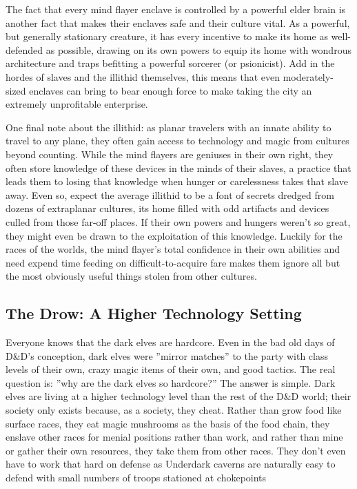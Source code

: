 The fact that every mind flayer enclave is controlled by a powerful elder brain is another fact that makes their enclaves safe and their culture vital. As a powerful, but generally stationary creature, it has every incentive to make its home as well-defended as possible, drawing on its own powers to equip its home with wondrous architecture and traps befitting a powerful sorcerer (or psionicist). Add in the hordes of slaves and the illithid themselves, this means that even moderately-sized enclaves can bring to bear enough force to make taking the city an extremely unprofitable enterprise.

One final note about the illithid: as planar travelers with an innate ability to travel to any plane, they often gain access to technology and magic from cultures beyond counting. While the mind flayers are geniuses in their own right, they often store knowledge of these devices in the minds of their slaves, a practice that leads them to losing that knowledge when hunger or carelessness takes that slave away. Even so, expect the average illithid to be a font of secrets dredged from dozens of extraplanar cultures, its home filled with odd artifacts and devices culled from those far-off places. If their own powers and hungers weren't so great, they might even be drawn to the exploitation of this knowledge. Luckily for the races of the worlds, the mind flayer's total confidence in their own abilities and need expend time feeding on difficult-to-acquire fare makes them ignore all but the most obviously useful things stolen from other cultures.\\



\subsection{The Drow: A Higher Technology Setting}
Everyone knows that the dark elves are hardcore. Even in the bad old days of D\&D's conception, dark elves were ''mirror matches'' to the party with class levels of their own, crazy magic items of their own, and good tactics. The real question is: ''why are the dark elves so hardcore?'' The answer is simple. Dark elves are living at a higher technology level than the rest of the D\&D world; their society only exists because, as a society, they cheat. Rather than grow food like surface races, they eat magic mushrooms as the basis of the food chain, they enslave other races for menial positions rather than work, and rather than mine or gather their own resources, they take them from other races. They don't even have to work that hard on defense as Underdark caverns are naturally easy to defend with small numbers of troops stationed at chokepoints

